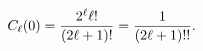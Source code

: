 \[\mathop{C_{\ell}\/}\nolimits\!\left(0\right)=\frac{2^{\ell}\ell!}{(2\ell+1)!}=%
\frac{1}{(2\ell+1)!!}.\]